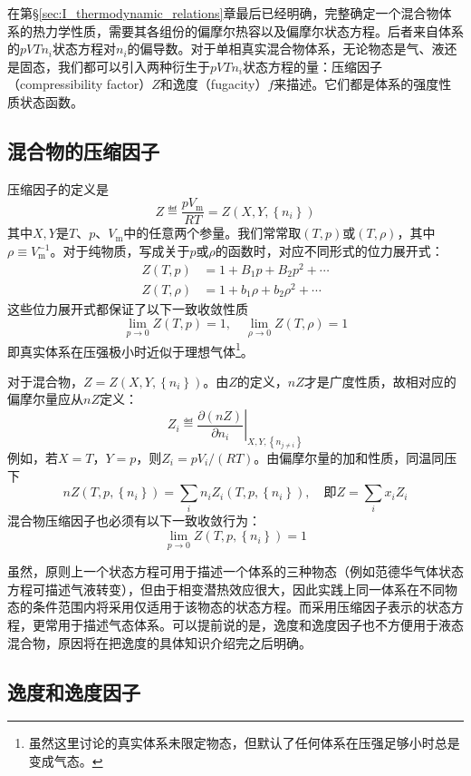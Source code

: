 \documentclass[main.tex]{subfiles}
\begin{document}
在第\S\ref{sec:I_thermodynamic_relations}章最后已经明确，完整确定一个混合物体系的热力学性质，需要其各组份的偏摩尔热容以及偏摩尔状态方程。后者来自体系的$pVTn_i$状态方程对$n_i$的偏导数。对于单相真实混合物体系，无论物态是气、液还是固态，我们都可以引入两种衍生于$pVTn_i$状态方程的量：压缩因子（compressibility factor）$Z$和逸度（fugacity）$f$来描述。它们都是体系的强度性质状态函数。

\subsection{混合物的压缩因子}
压缩因子的定义是
\[Z\eqdef \frac{pV_\text{m}}{RT}=Z\left(X,Y,\left\{n_i\right\}\right)\]
其中$X,Y$是$T$、$p$、$V_\text{m}$中的任意两个参量。我们常常取$\left(T,p\right)$或$\left(T,\rho\right)$，其中$\rho\equiv V^{-1}_\text{m}$。对于纯物质，写成关于$p$或$\rho$的函数时，对应不同形式的位力展开式：
\begin{align*}
    Z\left(T,p\right)    & =1+B_1p+B_2p^2+\cdots       \\
    Z\left(T,\rho\right) & =1+b_1\rho+b_2\rho^2+\cdots
\end{align*}
这些位力展开式都保证了以下一致收敛性质
\[\lim_{p\to 0}Z\left(T,p\right)=1,\quad\lim_{\rho\to 0}Z\left(T,\rho\right)=1\]
即真实体系在压强极小时近似于理想气体\footnote{虽然这里讨论的真实体系未限定物态，但默认了任何体系在压强足够小时总是变成气态。}。

对于混合物，$Z=Z\left(X,Y,\left\{n_i\right\}\right)$。由$Z$的定义，$nZ$才是广度性质，故相对应的偏摩尔量应从$nZ$定义：
\[Z_i\eqdef\left.\frac{\partial\left(nZ\right)}{\partial n_i}\right|_{X,Y,\left\{n_{j\neq i}\right\}}\]
例如，若$X=T$，$Y=p$，则$Z_i=pV_i/\left(RT\right)$。由偏摩尔量的加和性质，同温同压下
\[nZ\left(T,p,\left\{n_i\right\}\right)=\sum_in_iZ_i\left(T,p,\left\{n_i\right\}\right),\quad \text{即}Z=\sum_ix_iZ_i\]
混合物压缩因子也必须有以下一致收敛行为：
\[\lim_{p\to 0}Z\left(T,p,\left\{n_i\right\}\right)=1\]

虽然，原则上一个状态方程可用于描述一个体系的三种物态（例如范德华气体状态方程可描述气液转变），但由于相变潜热效应很大，因此实践上同一体系在不同物态的条件范围内将采用仅适用于该物态的状态方程。而采用压缩因子表示的状态方程，更常用于描述气态体系。可以提前说的是，逸度和逸度因子也不方便用于液态混合物，原因将在把逸度的具体知识介绍完之后明确。

\subsection{逸度和逸度因子}
\end{document}
